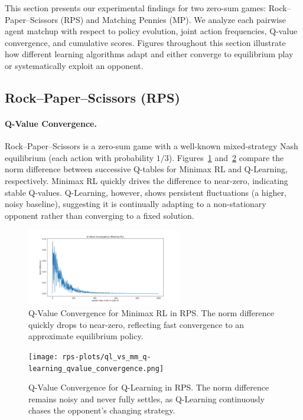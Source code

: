 \documentclass[11pt]{article}
\begin{document}
This section presents our experimental findings for two zero-sum games: 
Rock--Paper--Scissors (RPS) and Matching Pennies (MP). We analyze each 
pairwise agent matchup with respect to policy evolution, joint action 
frequencies, Q-value convergence, and cumulative scores. Figures 
throughout this section illustrate how different learning algorithms 
adapt and either converge to equilibrium play or systematically exploit 
an opponent.

\subsection{Rock--Paper--Scissors (RPS)}

\paragraph{Q-Value Convergence.}
Rock--Paper--Scissors is a zero-sum game with a well-known mixed-strategy 
Nash equilibrium (each action with probability $1/3$). 
Figures~\ref{fig:rps-minimax-convergence} and~\ref{fig:rps-ql-convergence} 
compare the norm difference between successive Q-tables for 
Minimax RL and Q-Learning, respectively. Minimax RL quickly drives the 
difference to near-zero, indicating stable Q-values. Q-Learning, however, 
shows persistent fluctuations (a higher, noisy baseline), suggesting it 
is continually adapting to a non-stationary opponent rather than 
converging to a fixed solution.

\begin{figure}[htbp]
    \centering
    \includegraphics[width=0.6\textwidth]{rps-plots/ql_vs_mm_minimax_rl_qvalue_convergence.png}
    \caption{Q-Value Convergence for Minimax RL in RPS. The norm difference 
    quickly drops to near-zero, reflecting fast convergence to an 
    approximate equilibrium policy.}
    \label{fig:rps-minimax-convergence}
\end{figure}

\begin{figure}[htbp]
    \centering
    \texttt{[image: rps-plots/ql\_vs\_mm\_q-learning\_qvalue\_convergence.png]}
    \caption{Q-Value Convergence for Q-Learning in RPS. The norm difference 
    remains noisy and never fully settles, as Q-Learning continuously 
    chases the opponent's changing strategy.}
    \label{fig:rps-ql-convergence}
\end{figure}
\end{document}
